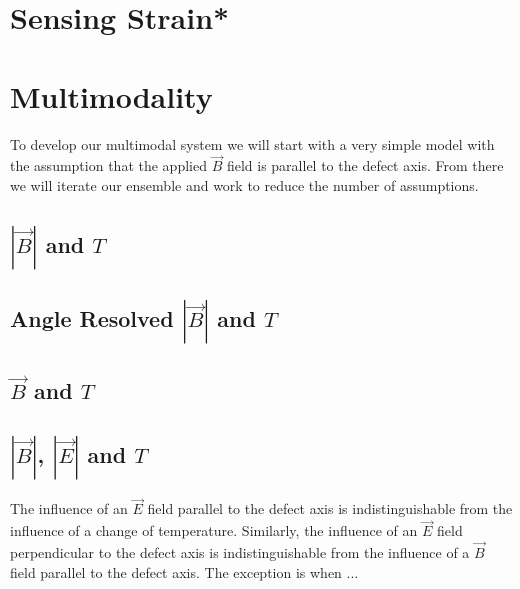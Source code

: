 \section{Sensing Strain*}
\lipsum[1-3]


\section{Multimodality}
To develop our multimodal system we will start with a very simple model with the assumption that the applied $\vec{B}$ field is parallel to the defect axis. From there we will iterate our ensemble and work to reduce the number of assumptions.  


\subsection{$|\vec{B}|$ and $T$}
\cite{Degen2008}
\lipsum[1-4]

\subsection{Angle Resolved $|\vec{B}|$ and $T$}
\cite{PhysRevApplied.4.014009}
\lipsum[1-4]

\subsection{$\vec{B}$ and $T$}
\lipsum[1-4]


\subsection{$|\vec{B}|$, $|\vec{E}|$ and $T$}
The influence of an $\vec{E}$ field parallel to the defect axis is indistinguishable from the influence of a change of temperature. Similarly, the influence of an $\vec{E}$ field perpendicular to the defect axis is indistinguishable from the influence of a $\vec{B}$ field parallel to the defect axis. The exception is when ... 

\begin{figure}[h]
    \begin{center}
    \end{center}
    \caption{}\label{fig:}
\end{figure}


